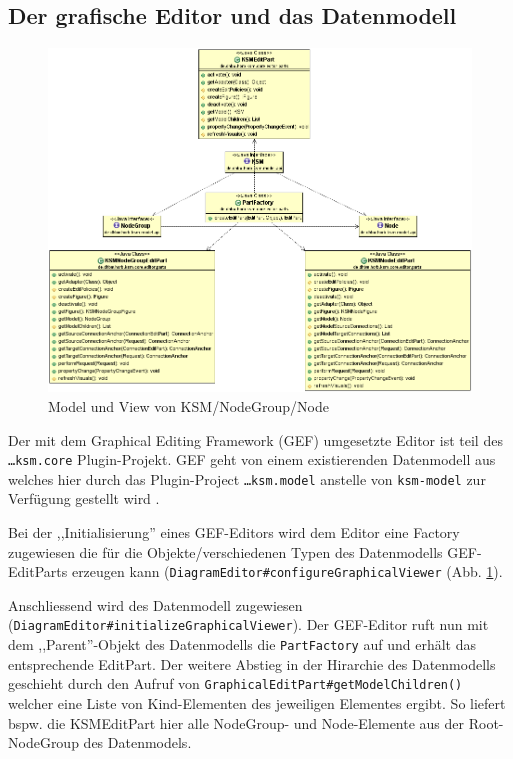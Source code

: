 \documentclass[%
12pt,titlepage,abstracton,DIV=10]{scrreprt}
\begin{document}
\subsection{Der grafische Editor und das Datenmodell}
\begin{figure}[ht]
\centering
\includegraphics[width=\textwidth]{images/model.PNG}
\caption{Model und View von KSM/NodeGroup/Node}
\label{fig:model}
\end{figure}

Der mit dem Graphical Editing Framework (GEF) umgesetzte Editor ist teil des
\texttt{\ldots ksm.\-core} Plugin-Projekt. GEF geht von einem existierenden
Datenmodell aus welches hier durch das Plugin-Project \texttt{\ldots ksm.model}
anstelle von \texttt{ksm-model} zur Verfügung gestellt wird \cite{gef1}.

Bei der ,,Initialisierung'' eines GEF-Editors wird dem Editor eine Factory
zugewiesen die für die Objekte/verschiedenen Typen des Datenmodells
GEF-EditParts erzeugen kann
(\texttt{Diagram\-Editor\-\#configureGraphicalViewer} (Abb. \ref{fig:model}).

Anschliessend wird des Datenmodell zugewiesen
(\texttt{DiagramEditor\-\#initialize\-Graph\-ical\-Viewer}). Der GEF-Editor ruft
nun mit dem ,,Parent''-Objekt des Datenmodells die \texttt{Part\-Factory} auf
und erhält das entsprechende EditPart. Der weitere Abstieg in der Hirarchie des
Datenmodells geschieht durch den Aufruf von
\texttt{Graphical\-Edit\-Part\-\#getModel\-Children()} welcher eine Liste von
Kind-Elementen des jeweiligen Elementes ergibt. So liefert bspw. die KSMEditPart
hier alle NodeGroup- und Node-Elemente aus der Root-NodeGroup des Datenmodels.
\end{document}
